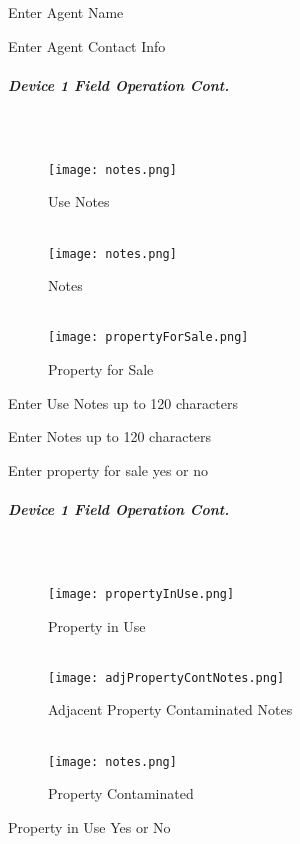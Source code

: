 \documentclass[class=article , crop=false, titlepage, twoside, multi={itemize, figure, verbatim}, float=false]{standalone}
\begin{document}
\noindent Enter Agent Name\\
\vspace{2in}

\noindent Enter Agent Contact Info\\

\clearpage
\subparagraph*{Device 1 Field Operation Cont.}
\subparagraph*{\\}
\begin{wrapfigure}{r}{0.5\textwidth}
\centering
\texttt{[image: notes.png]}
\caption {Use Notes}
\vspace{.2in}
\HRule \\[.4cm] %
\vspace{.2in}
\texttt{[image: notes.png]}
\caption{Notes}
\vspace{.2in}
\HRule \\[.4cm] %
\vspace{.2in}
\texttt{[image: propertyForSale.png]}
\caption{Property for Sale}
\end{wrapfigure}
Enter  Use Notes up to 120 characters\\
\vspace{2in}

\noindent Enter Notes up to 120 characters\\
\vspace{2in}

\noindent Enter property for sale yes or no\\

\clearpage
\subparagraph*{Device 1 Field Operation Cont.}
\subparagraph*{\\}
\begin{wrapfigure}{r}{0.5\textwidth}
\centering
\texttt{[image: propertyInUse.png]}
\caption {Property in Use}
\vspace{.2in}
\HRule \\[.4cm] %
\vspace{.2in}
\texttt{[image: adjPropertyContNotes.png]}
\caption{Adjacent Property Contaminated Notes}
\vspace{.2in}
\HRule \\[.4cm] %
\vspace{.2in}
\texttt{[image: notes.png]}
\caption{Property Contaminated}
\end{wrapfigure}
Property in Use Yes or No\\
\vspace{2in}
\end{document}
